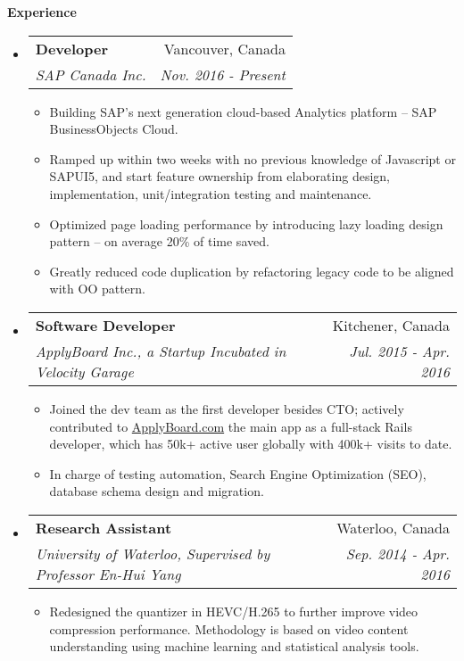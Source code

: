 \documentclass[letterpaper,10pt]{article}
\makeatletter
\newcommand{\resitem}[1]{\item #1 \vspace{-2pt}}
\newcommand{\resheading}[1]{{\large \colorbox{mygrey}{\begin{minipage}{\textwidth}{\textbf{#1 \vphantom{p\^{E}}}}\end{minipage}}}}
\newcommand{\ressubheading}[4]{
\begin{tabular*}{7.0in}{l@{\extracolsep{\fill}}r}
		\textbf{#1} & #2 \\
		\textit{#3} & \textit{#4} \\
\end{tabular*}\vspace{-6pt}}
\makeatother
\begin{document}
\resheading{Experience}
\begin{itemize}
\itemsep0em
\item
    \ressubheading{Developer}{Vancouver, Canada}{SAP Canada Inc.}{ Nov. 2016 - Present}
	\begin{itemize}
        \resitem{Building SAP's next generation cloud-based Analytics platform -- SAP BusinessObjects Cloud.}
        \resitem{Ramped up within two weeks with no previous knowledge of Javascript or SAPUI5, and start feature ownership from elaborating design, implementation, unit/integration testing and maintenance.}
        \resitem{Optimized page loading performance by introducing lazy loading design pattern -- on average 20\% of time saved.}
        \resitem{Greatly reduced code duplication by refactoring legacy code to be aligned with OO pattern.}
	\end{itemize}
\item
    \ressubheading{Software Developer}{Kitchener, Canada}{ApplyBoard Inc., a Startup Incubated in Velocity Garage}{ Jul. 2015 - Apr. 2016}
	\begin{itemize}
        \resitem{Joined the dev team as the first developer besides CTO; actively contributed to \href{https://www.applyboard.com/student}{ApplyBoard.com} the main app as a full-stack Rails developer, which has 50k+ active user globally with 400k+ visits to date.}
		\resitem{In charge of testing automation, Search Engine Optimization (SEO), database schema design and migration.}
	\end{itemize}
\item
	\ressubheading{Research Assistant}{Waterloo, Canada}{University of Waterloo, Supervised by Professor En-Hui Yang}{Sep. 2014 - Apr. 2016}
	\begin{itemize}
		\resitem{Redesigned the quantizer in HEVC/H.265 to further improve video compression performance. Methodology is based on video content understanding using machine learning and statistical analysis tools.}
	\end{itemize}
\end{itemize}
\end{document}
